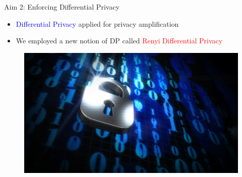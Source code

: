 \documentclass{beamer}
\begin{document}



 



  



\begin{frame}{Aim 2: Enforcing Differential Privacy}

\begin{itemize}
  \item \textcolor{blue}{Differential Privacy} applied for privacy amplification
  \item We employed a new notion of DP called \textcolor{red}{Renyi Differential Privacy}

\end{itemize}

  \begin{figure}
\includegraphics[scale=0.2]{_img/privacy.png}
\caption{\label{fig:privacy}{}{}}
\end{figure}
\vskip 1cm
 

\end{frame}
\end{document}
